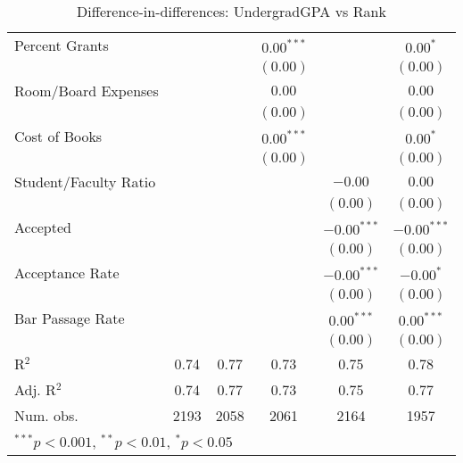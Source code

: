 \begin{table}
\begin{center}
\begin{tabular}{l c c c c c }
Percent Grants        &               &               & $0.00^{***}$  &               & $0.00^{*}$    \\
                      &               &               & $(0.00)$      &               & $(0.00)$      \\
Room/Board Expenses   &               &               & $0.00$        &               & $0.00$        \\
                      &               &               & $(0.00)$      &               & $(0.00)$      \\
Cost of Books         &               &               & $0.00^{***}$  &               & $0.00^{*}$    \\
                      &               &               & $(0.00)$      &               & $(0.00)$      \\
Student/Faculty Ratio &               &               &               & $-0.00$       & $0.00$        \\
                      &               &               &               & $(0.00)$      & $(0.00)$      \\
Accepted              &               &               &               & $-0.00^{***}$ & $-0.00^{***}$ \\
                      &               &               &               & $(0.00)$      & $(0.00)$      \\
Acceptance Rate       &               &               &               & $-0.00^{***}$ & $-0.00^{*}$   \\
                      &               &               &               & $(0.00)$      & $(0.00)$      \\
Bar Passage Rate      &               &               &               & $0.00^{***}$  & $0.00^{***}$  \\
                      &               &               &               & $(0.00)$      & $(0.00)$      \\
\hline
R$^2$                 & 0.74          & 0.77          & 0.73          & 0.75          & 0.78          \\
Adj. R$^2$            & 0.74          & 0.77          & 0.73          & 0.75          & 0.77          \\
Num. obs.             & 2193          & 2058          & 2061          & 2164          & 1957          \\
\hline
\multicolumn{6}{l}{\scriptsize{$^{***}p<0.001$, $^{**}p<0.01$, $^*p<0.05$}}
\end{tabular}
\caption{Difference-in-differences: UndergradGPA vs Rank}
\label{tab:gpa-rank}
\end{center}
\end{table}

